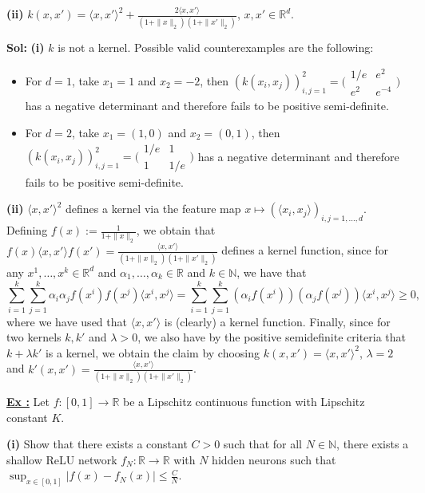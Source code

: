 \documentclass[a4paper,10pt]{article}
\newcounter{exerciseCounter}
\newcommand{\exercise}[1]{%
    \vspace{1mm}
    \stepcounter{exerciseCounter}%
    \color{exerciseBlack}
    \textbf{\underline{Ex \theexerciseCounter:}} #1
}
\newcommand{\solution}[1]{%
    {\color{solutionGray} \textbf{Sol: } #1} %
}
\begin{document}
\begin{scriptsize}
{\textbf{(ii)} $k(x, x') = \langle x, x' \rangle^2 + \frac{2 \langle x, x' \rangle}{(1 + \|x\|_2)(1 + \|x'\|_2)}$, $x, x' \in \mathbb{R}^d$.}
\solution{
\textbf{(i)} $k$ is not a kernel. Possible valid counterexamples are the following:
\begin{itemize}
    \item For $d = 1$, take $x_1 = 1$ and $x_2 = -2$, then $(k(x_i, x_j))_{i,j=1}^2 = \bigl(\begin{smallmatrix} 1/e & e^2 \\ e^2 & e^{-4} \end{smallmatrix}\bigr)$ has a negative determinant and therefore fails to be positive semi-definite.
    \item For $d = 2$, take $x_1 = (1, 0)$ and $x_2 = (0, 1)$, then $(k(x_i, x_j))_{i,j=1}^2 = \bigl(\begin{smallmatrix} 1/e & 1 \\ 1 & 1/e \end{smallmatrix}\bigr)$ has a negative determinant and therefore fails to be positive semi-definite.
\end{itemize}

\textbf{(ii)} $\langle x, x' \rangle^2$ defines a kernel via the feature map $x \mapsto (\langle x_i, x_j \rangle)_{i,j=1,\dots,d}$. Defining $f(x) := \frac{1}{1 + \|x\|_2}$, we obtain that $f(x)\langle x, x' \rangle f(x') = \frac{\langle x, x' \rangle}{(1+\|x\|_2)(1+\|x'\|_2)}$ defines a kernel function, since for any $x^1, \dots, x^k \in \mathbb{R}^d$ and $\alpha_1, \dots, \alpha_k \in \mathbb{R}$ and $k \in \mathbb{N}$, we have that
\[
\sum_{i=1}^k \sum_{j=1}^k \alpha_i \alpha_j f(x^i) f(x^j) \langle x^i, x^j \rangle = \sum_{i=1}^k \sum_{j=1}^k (\alpha_i f(x^i)) (\alpha_j f(x^j)) \langle x^i, x^j \rangle \geq 0,
\]
where we have used that $\langle x, x' \rangle$ is (clearly) a kernel function. Finally, since for two kernels $k, k'$ and $\lambda > 0$, we also have by the positive semidefinite criteria that $k + \lambda k'$ is a kernel, we obtain the claim by choosing $k(x, x') = \langle x, x' \rangle^2$, $\lambda = 2$ and $k'(x, x') = \frac{\langle x, x' \rangle}{(1+\|x\|_2)(1+\|x'\|_2)}$.}

\exercise{Let $f : [0,1] \to \mathbb{R}$ be a Lipschitz continuous function with Lipschitz constant $K$.

\textbf{(i)} Show that there exists a constant $C > 0$ such that for all $N \in \mathbb{N}$, there exists a shallow ReLU network $f_N : \mathbb{R} \to \mathbb{R}$ with $N$ hidden neurons such that
$\sup_{x \in [0,1]} |f(x) - f_N(x)| \leq \frac{C}{N}$.

}
\end{scriptsize}
\end{document}
